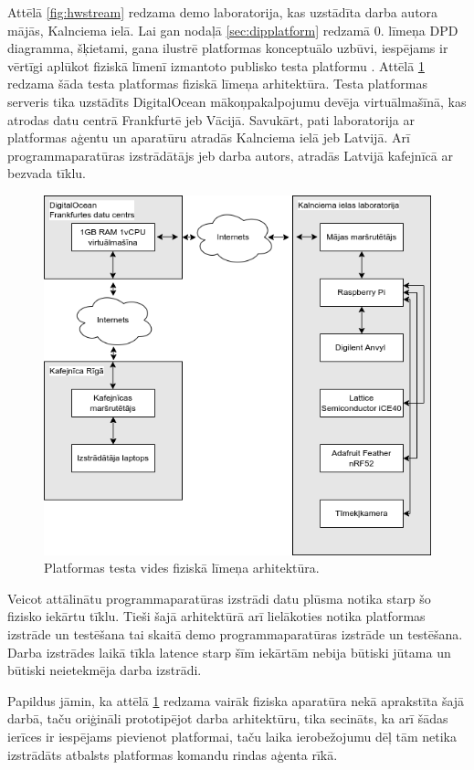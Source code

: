 Attēlā \ref{fig:hwstream} redzama demo laboratorija, kas uzstādīta darba autora
mājās, Kalnciema ielā. Lai gan nodaļā \ref{sec:dipplatform} redzamā 0. līmeņa DPD
diagramma, šķietami, gana ilustrē platformas konceptuālo uzbūvi, iespējams ir
vērtīgi aplūkot fiziskā līmenī izmantoto publisko testa platformu
\cite{VeinbahsKrisjanisProduction}. Attēlā \ref{fig:production} redzama šāda
testa platformas fiziskā līmeņa arhitektūra. Testa platformas serveris tika
uzstādīts DigitalOcean mākoņpakalpojumu devēja virtuālmašīnā, kas atrodas datu
centrā Frankfurtē jeb Vācijā. Savukārt, pati laboratorija ar platformas aģentu
un aparatūru atradās Kalnciema ielā jeb Latvijā. Arī programmaparatūras
izstrādātājs jeb darba autors, atradās Latvijā kafejnīcā ar bezvada tīklu.

\begin{figure}[H]
    \includegraphics[width=0.8\linewidth]{assets/production.drawio.png}
    \centering
    \caption{Platformas testa vides fiziskā līmeņa arhitektūra.}
    \label{fig:production}
\end{figure}

Veicot attālinātu programmaparatūras izstrādi datu plūsma notika starp šo
fizisko iekārtu tīklu. Tieši šajā arhitektūrā arī lielākoties notika platformas
izstrāde un testēšana tai skaitā demo programmaparatūras izstrāde un testēšana.
Darba izstrādes laikā tīkla latence starp šīm iekārtām nebija būtiski jūtama un
būtiski neietekmēja darba izstrādi.

Papildus jāmin, ka attēlā \ref{fig:production} redzama vairāk fiziska aparatūra
nekā aprakstīta šajā darbā, taču oriģināli prototipējot darba arhitektūru, tika
secināts, ka arī šādas ierīces ir iespējams pievienot platformai, taču laika
ierobežojumu dēļ tām netika izstrādāts atbalsts platformas komandu rindas aģenta
rīkā. 
